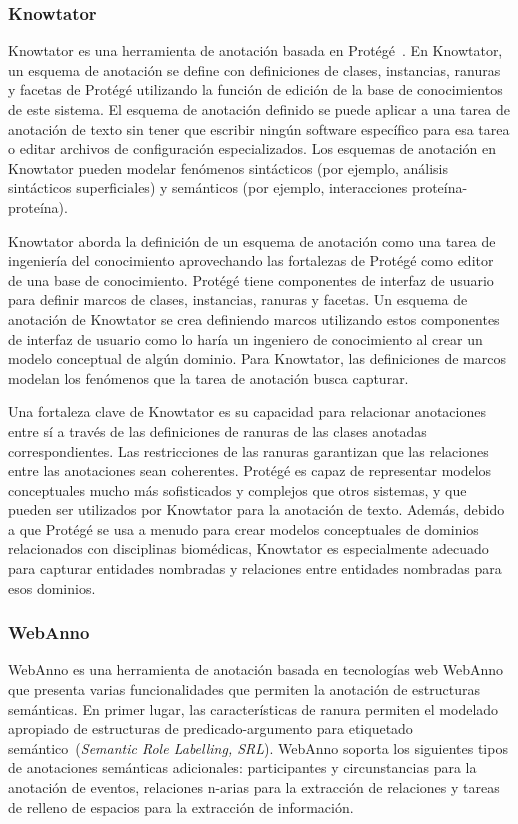 \subsubsection*{Knowtator}

Knowtator es una herramienta de anotación basada en Protégé~\cite{protege}.
En Knowtator, un esquema de anotación se define con definiciones de clases, instancias, ranuras y facetas de Protégé utilizando la función de edición de la base de conocimientos de este sistema.
El esquema de anotación definido se puede aplicar a una tarea de anotación de texto sin tener que escribir ningún software específico para esa tarea o editar archivos de configuración especializados.
Los esquemas de anotación en Knowtator pueden modelar fenómenos sintácticos (por ejemplo, análisis sintácticos superficiales) y semánticos (por ejemplo, interacciones proteína-proteína).

Knowtator aborda la definición de un esquema de anotación como una tarea de ingeniería del conocimiento aprovechando las fortalezas de Protégé como editor de una base de conocimiento.
Protégé tiene componentes de interfaz de usuario para definir marcos de clases, instancias, ranuras y facetas.
Un esquema de anotación de Knowtator se crea definiendo marcos utilizando estos componentes de interfaz de usuario como lo haría un ingeniero de conocimiento al crear un modelo conceptual de algún dominio.
Para Knowtator, las definiciones de marcos modelan los fenómenos que la tarea de anotación busca capturar.

Una fortaleza clave de Knowtator es su capacidad para relacionar anotaciones entre sí a través de las definiciones de ranuras de las clases anotadas correspondientes.
Las restricciones de las ranuras garantizan que las relaciones entre las anotaciones sean coherentes.
Protégé es capaz de representar modelos conceptuales mucho más sofisticados y complejos que otros sistemas, y que pueden ser utilizados por Knowtator para la anotación de texto.
Además, debido a que Protégé se usa a menudo para crear modelos conceptuales de dominios relacionados con disciplinas biomédicas, Knowtator es especialmente adecuado para capturar entidades nombradas y relaciones entre entidades nombradas para esos dominios.

\subsubsection*{WebAnno}

WebAnno es una herramienta de anotación basada en tecnologías web WebAnno que presenta varias funcionalidades que permiten la anotación de estructuras semánticas.
En primer lugar, las características de ranura permiten el modelado apropiado de estructuras de predicado-argumento para etiquetado semántico~(\textit{Semantic Role Labelling, SRL}).
WebAnno soporta los siguientes tipos de anotaciones semánticas adicionales: participantes y circunstancias para la anotación de eventos, relaciones n-arias para la extracción de relaciones y tareas de relleno de espacios para la extracción de información.

